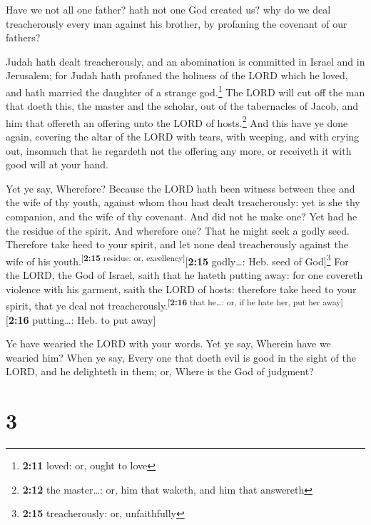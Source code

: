  Have we not all one father? hath not one God created us?
why do we deal treacherously every man against his brother, by profaning
the covenant of our fathers?

 Judah hath dealt treacherously, and an abomination is
committed in Israel and in Jerusalem; for Judah hath profaned the
holiness of the LORD which he loved, and hath married the daughter of a
strange god.\footnote{\textbf{2:11} loved: or, ought to love}
 The LORD will cut off the man that doeth this, the
master and the scholar, out of the tabernacles of Jacob, and him that
offereth an offering unto the LORD of hosts.\footnote{\textbf{2:12} the
  master\ldots: or, him that waketh, and him that answereth}
 And this have ye done again, covering the altar of the
LORD with tears, with weeping, and with crying out, insomuch that he
regardeth not the offering any more, or receiveth it with good will at
your hand.

 Yet ye say, Wherefore? Because the LORD hath been
witness between thee and the wife of thy youth, against whom thou hast
dealt treacherously: yet is she thy companion, and the wife of thy
covenant.  And did not he make one? Yet had he the
residue of the spirit. And wherefore one? That he might seek a godly
seed. Therefore take heed to your spirit, and let none deal
treacherously against the wife of his
youth.\textsuperscript{{[}\textbf{2:15} residue: or,
excellency{]}}{[}\textbf{2:15} godly\ldots: Heb. seed of
God{]}\footnote{\textbf{2:15} treacherously: or, unfaithfully}
 For the LORD, the God of Israel, saith that he hateth
putting away: for one covereth violence with his garment, saith the LORD
of hosts: therefore take heed to your spirit, that ye deal not
treacherously.\textsuperscript{{[}\textbf{2:16} that he\ldots: or, if he
hate her, put her away{]}}{[}\textbf{2:16} putting\ldots: Heb. to put
away{]}

 Ye have wearied the LORD with your words. Yet ye say,
Wherein have we wearied him? When ye say, Every one that doeth evil is
good in the sight of the LORD, and he delighteth in them; or, Where is
the God of judgment?

\hypertarget{section-2}{%
\section{3}\label{section-2}}

